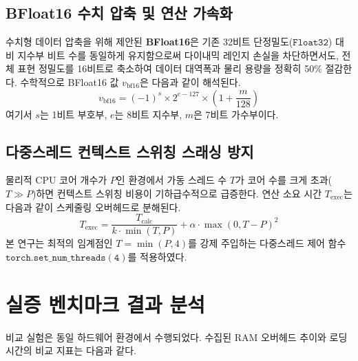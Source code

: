 \documentclass[twocolumn]{article}
\begin{document}
\subsection{BFloat16 수치 압축 및 연산 가속화}
수치형 데이터 압축을 위해 제안된 \textbf{BFloat16}은 기존 32비트 단정밀도($\mathtt{Float32}$) 대비 지수부 비트 수를 동일하게 유지함으로써 다이내믹 레인지 손실을 차단하면서도, 전체 표현 정밀도를 16비트로 축소하여 데이터 대역폭과 물리 용량을 정확히 50\% 절감한다. 수학적으로 BFloat16 값 $v_{\text{bf16}}$은 다음과 같이 해석된다.
\begin{equation}
v_{\text{bf16}} = (-1)^{s} \times 2^{e - 127} \times \left(1 + \frac{m}{128}\right)
\end{equation}
여기서 $s$는 1비트 부호부, $e$는 8비트 지수부, $m$은 7비트 가수부이다.

\subsection{다중스레드 컨텍스트 스위칭 스래싱 방지}
물리적 CPU 코어 개수가 $P$인 환경에서 가동 스레드 수 $T$가 코어 수를 크게 초과($T \gg P$)하면 컨텍스트 스위칭 비용이 기하급수적으로 급증한다. 연산 소요 시간 $T_{\text{exec}}$는 다음과 같이 스케줄링 오버헤드로 분해된다.
\begin{equation}
T_{\text{exec}} = \frac{T_{\text{calc}}}{k \cdot \min(T, P)} + \alpha \cdot \max(0, T - P)^{2}
\end{equation}
본 연구는 최적의 임계점인 $T = \min(P, 4)$를 강제 주입하는 다중스레드 제어 함수 $\mathtt{torch.set\_num\_threads(4)}$를 적용하였다.

\section{실증 벤치마크 결과 분석}
비교 실험은 동일 하드웨어 환경에서 수행되었다. 수집된 RAM 오버헤드 추이와 로딩 시간의 비교 지표는 다음과 같다.

\begin{table}[h]
\centering
\caption{Qwen3-TTS CPU 최적화 전후 성능 비교}
\end{table}
\end{document}
